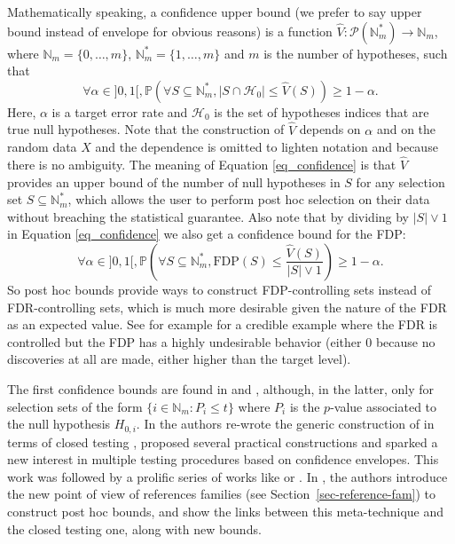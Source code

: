 \documentclass[
  11pt,
  a4paper,
]{article}
\theoremstyle{plain}
\theoremstyle{plain}
\theoremstyle{plain}
\theoremstyle{definition}
\theoremstyle{definition}
\theoremstyle{remark}
\begin{document}
Mathematically speaking, a confidence upper bound (we prefer to say
upper bound instead of envelope for obvious reasons) is a function
\(\widehat V: \mathcal{P}(\mathbb{N}_m^*) \to \mathbb{N}_m\), where
\(\mathbb{N}_m=\{0,\dotsc,m\}\), \(\mathbb{N}_m^*=\{1,\dotsc,m\}\) and
\(m\) is the number of hypotheses, such that \begin{equation}
\forall \alpha \in ]0,1[, \mathbb{P}\left(\forall S \subseteq \mathbb{N}_m^*, |S\cap \mathcal{H}_0|\leq \widehat V(S)\right)\geq 1-\alpha.
\label{eq_confidence}
\end{equation} Here, \(\alpha\) is a target error rate and
\(\mathcal{H}_0\) is the set of hypotheses indices that are true null
hypotheses. Note that the construction of \(\widehat V\) depends on
\(\alpha\) and on the random data \(X\) and the dependence is omitted to
lighten notation and because there is no ambiguity. The meaning of
Equation \eqref{eq_confidence} is that \(\widehat V\) provides an upper
bound of the number of null hypotheses in \(S\) for any selection set
\(S\subseteq \mathbb{N}_m^*\), which allows the user to perform post hoc
selection on their data without breaching the statistical guarantee.
Also note that by dividing by \(|S|\vee 1\) in Equation
\eqref{eq_confidence} we also get a confidence bound for the FDP:
\begin{equation}
\forall \alpha \in ]0,1[, \mathbb{P}\left(\forall S \subseteq \mathbb{N}_m^*, \mathrm{FDP}(S)\leq \frac{\widehat V(S)}{|S|\vee 1}\right)\geq 1-\alpha.
\label{eq_confidence_fdp}
\end{equation} So post hoc bounds provide ways to construct
FDP-controlling sets instead of FDR-controlling sets, which is much more
desirable given the nature of the FDR as an expected value. See for
example \citep[Figure 4]{MR3418717} for a credible example where the FDR
is controlled but the FDP has a highly undesirable behavior (either 0
because no discoveries at all are made, either higher than the target
level).

The first confidence bounds are found in \citet{MR2279468} and
\citet{MR2279639}, although, in the latter, only for selection sets of
the form \(\{i\in\mathbb{N}_m: P_i\leq t\}\) where \(P_i\) is the
\(p\)-value associated to the null hypothesis \(H_{0,i}\). In
\citet{MR2951390} the authors re-wrote the generic construction of
\citet{MR2279468} in terms of closed testing \citet{MR468056}, proposed
several practical constructions and sparked a new interest in multiple
testing procedures based on confidence envelopes. This work was followed
by a prolific series of works like \citet{MR3305943} or
\citet{MR4731977}. In \citet{MR4124323}, the authors introduce the new
point of view of references families (see
Section~\ref{sec-reference-fam}) to construct post hoc bounds, and show
the links between this meta-technique and the closed testing one, along
with new bounds.
\end{document}
